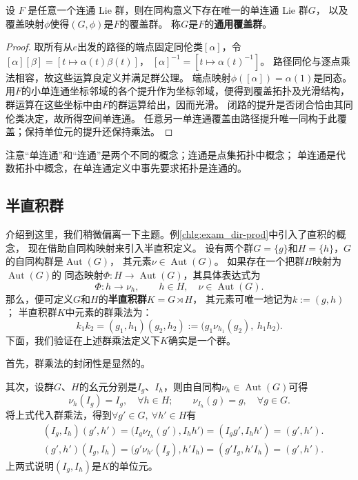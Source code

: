 \begin{theorem}
    设 $F$ 是任意一个连通 Lie 群，则在同构意义下存在唯一的单连通 Lie 群$G$，
    以及覆盖映射$\phi$使得$(G,\phi)$是$F$的覆盖群。
    称$G$是$F$的\textbf{通用覆盖群}。
\end{theorem}
\begin{proof}
取所有从$e$出发的路径的端点固定同伦类$[\alpha]$，令
$[\alpha][\beta]=[t\mapsto\alpha(t)\beta(t)]$，
$[\alpha]^{-1}=[t\mapsto\alpha(t)^{-1}]$。
路径同伦与逐点乘法相容，故这些运算良定义并满足群公理。
端点映射$\phi([\alpha])=\alpha(1)$是同态。
用$F$的小单连通坐标邻域的各个提升作为坐标邻域，便得到覆盖拓扑及光滑结构，
群运算在这些坐标中由$F$的群运算给出，因而光滑。
闭路的提升是否闭合恰由其同伦类决定，故所得空间单连通。
任意另一单连通覆盖由路径提升唯一同构于此覆盖；保持单位元的提升还保持乘法。
\end{proof}

注意“单连通”和“连通”是两个不同的概念；连通是点集拓扑中概念；
单连通是代数拓扑中概念，在单连通定义中事先要求拓扑是连通的。

\subsection{半直积群}\label{chlg:sec_semi-dir-prod}
介绍到这里，我们稍微偏离一下主题。例\ref{chlg:exam_dir-prod}中引入了{直积}的概念，
现在借助自同构映射来引入{半直积}定义。
设有两个群$G=\{g\}$和$H=\{h\}$，$G$的自同构群是$\operatorname{Aut}(G)$，
其元素$\nu \in \operatorname{Aut}(G)$。
如果存在一个把群$H$映射为$\operatorname{Aut}(G)$的
同态映射$\Phi:H\to \operatorname{Aut}(G)$，其具体表达式为
\begin{equation}
    \Phi : h \to \nu_h ,\qquad h\in H,\quad \nu \in \operatorname{Aut}(G).
\end{equation}
那么，便可定义$G$和$H$的\textbf{半直积群}$K=G  \rtimes H$，
其元素可唯一地记为$k := (g,h)$；
半直积群$K$中元素的群乘法为：
\begin{equation}
    k_1 k_2 = (g_1, h_1) (g_2, h_2)
    := \bigl(g_1 \nu_{h_1}(g_2),\ h_1 h_2 \bigr) .
\end{equation}
下面，我们验证在上述群乘法定义下$K$确实是一个群。

首先，群乘法的封闭性是显然的。

其次，设群$G$、$H$的幺元分别是$I_g$、$I_h$，则由自同构$\nu_h\in \operatorname{Aut}(G)$可得
\begin{equation}
    \nu_h (I_g)   =I_g, \quad  \forall h\in H ; \qquad
    \nu_{I_h} (g) = g,  \quad  \forall g\in G .
\end{equation}
将上式代入群乘法，得到$\forall g'\in G,\ \forall h'\in H$有
\begin{align}
    &( I_g, I_h ) (g', h') = \bigl( I_g \nu_{I_h}(g'), I_h h' \bigr)
    = ( I_g g', I_h h') =( g' ,h'). \\
    & ( g' ,h' )( I_g, I_h ) = \bigl(g'  \nu_{h'}( I_g), h' I_h \bigr)
    =(g' I_g,  h' I_h) =( g', h').
\end{align}
上两式说明$( I_g, I_h) $是$K$的{单位元}。

